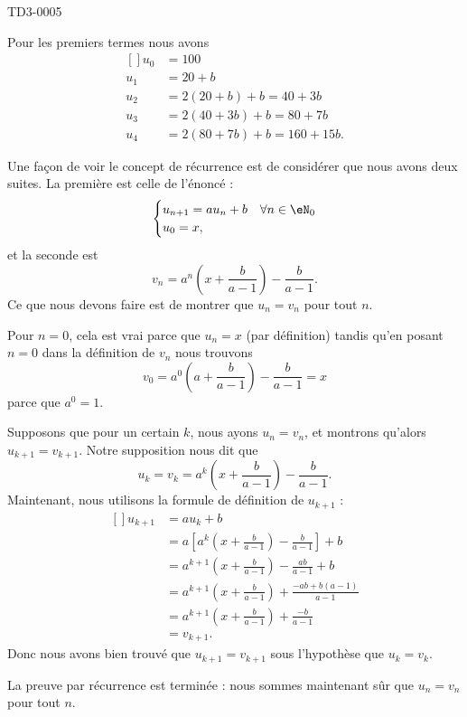 
\begin{corrige}{TD3-0005}

	Pour les premiers termes nous avons
	\begin{equation}
		\begin{aligned}[]
			u_0&=100\\
			u_1&=20+b\\
			u_2&=2(20+b)+b=40+3b\\
			u_3&=2(40+3b)+b=80+7b\\
			u_4&=2(80+7b)+b=160+15b.
		\end{aligned}
	\end{equation}
	
	Une façon de voir le concept de récurrence est de considérer que nous avons deux suites. La première est celle de l'énoncé :
	\begin{equation}
		\begin{cases}
			u_{n+1}=au_n+b	&	\forall n\in\eN_0\\
			u_0=x,
		\end{cases}
	\end{equation}
	et la seconde est 
	\begin{equation}
		v_n=a^n\left( x+\frac{ b }{ a-1 } \right)-\frac{ b }{ a-1 }.
	\end{equation}
	Ce que nous devons faire est de montrer que $u_n=v_n$ pour tout $n$.

	Pour $n=0$, cela est vrai parce que $u_n=x$ (par définition) tandis qu'en posant $n=0$ dans la définition de $v_n$ nous trouvons 
	\begin{equation}
		v_0=a^0\left( a+\frac{ b }{ a-1 } \right)-\frac{ b }{ a-1 }=x
	\end{equation}
	parce que $a^0=1$.

	Supposons que pour un certain $k$, nous ayons $u_n=v_n$, et montrons qu'alors $u_{k+1}=v_{k+1}$. Notre supposition nous dit que
	\begin{equation}
		u_k=v_k=a^k\left( x+\frac{ b }{ a-1 } \right)-\frac{ b }{ a-1 }.
	\end{equation}
	Maintenant, nous utilisons la formule de définition de $u_{k+1}$ :
	\begin{equation}
		\begin{aligned}[]
			u_{k+1}&=au_k+b\\
			&=a\left[ a^k\left( x+\frac{ b }{ a-1 } \right)-\frac{ b }{ a-1 } \right]+b\\
			&=a^{k+1}\left( x+\frac{ b }{ a-1 } \right)-\frac{ ab }{ a-1 }+b\\
			&=a^{k+1}\left( x+\frac{ b }{ a-1 } \right)+\frac{ -ab+b(a-1) }{ a-1 }\\
			&=a^{k+1}\left( x+\frac{ b }{ a-1 } \right)+\frac{ -b }{ a-1 }\\
			&=v_{k+1}.
		\end{aligned}
	\end{equation}
	Donc nous avons bien trouvé que $u_{k+1}=v_{k+1}$ sous l'hypothèse que $u_k=v_k$. 

	La preuve par récurrence est terminée : nous sommes maintenant sûr que $u_n=v_n$ pour tout $n$.
\end{corrige}
